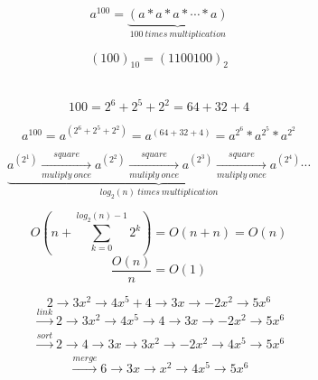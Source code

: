 \documentclass{article}
\begin{document}
\begin{CJK*}{GBK}{song}

\[ a^{100} = \underbrace { \left( {a*a*a* \cdots *a} \right)}_{100\ times\ multiplication} \]

\[ \left( {100} \right)_{10} = \left( {1100100} \right)_{2} \]\

\[ 100=2^6+2^5+2^2=64+32+4 \]

\[ a^{100} = a^{ \left( 2^6+2^5+2^2 \right)}=a^{ \left( 64+32+4 \right)}=a^{2^6}*a^{2^5}*a^{2^2} \]

\[ 
  \underbrace { a^{ \left( 2^1 \right) } \xrightarrow[muliply\ once]{square} a^{ \left( 2^2 \right) }
   \xrightarrow[muliply\ once]{square} a^{ \left( 2^3 \right) } 
  \xrightarrow[muliply\ once]{square} a^{ \left( 2^4 \right) } \cdots }_{log_2(n)\ times\ multiplication} \]


\[ O(n+\sum^{log_2(n)-1}_{k=0} {2^k})=O(n+n)=O(n) \]
\[\frac{O(n)}{n}=O(1)\]

\[ \boxed{2} \longrightarrow \boxed{3x^2} \longrightarrow \boxed{4x^5} + \boxed{4} \longrightarrow \boxed{3x} \longrightarrow \boxed{-2x^2} \longrightarrow \boxed{5x^6}\]
\[\xrightarrow[]{link}  \boxed{2} \longrightarrow \boxed{3x^2} \longrightarrow \boxed{4x^5} \longrightarrow  \boxed{4} \longrightarrow \boxed{3x} \longrightarrow \boxed{-2x^2} \longrightarrow \boxed{5x^6} \]
\[\xrightarrow[]{sort} \boxed{2} \longrightarrow  \boxed{4} \longrightarrow \boxed{3x} \longrightarrow \boxed{3x^2} \longrightarrow \boxed{-2x^2} \longrightarrow \boxed{4x^5} \longrightarrow \boxed{5x^6}\]
\[\xrightarrow[]{merge}  \boxed{6} \longrightarrow \boxed{3x} \longrightarrow \boxed{x^2} \longrightarrow \boxed{4x^5} \longrightarrow \boxed{5x^6}\]

\end{CJK*}
\end{document}
